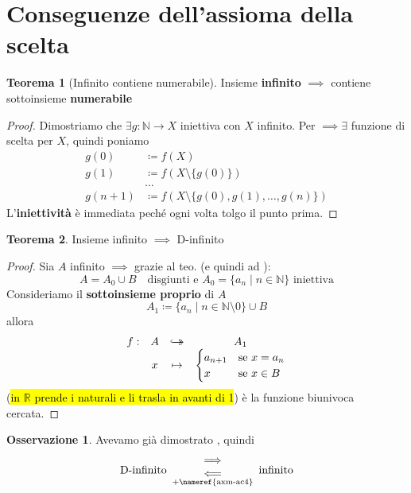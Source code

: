 \documentclass[a4paper,10pt]{article}
\theoremstyle{definition}
\newcommand{\na}{\mathbb{N}} %
\newcommand{\re}{\mathbb{R}} %
\newcommand{\hookdoubleheadrightarrow}{\hookrightarrow\mathrel{\mspace{-15mu}}\rightarrow}
\newcommand{\bij}{\hookdoubleheadrightarrow} %
\theoremstyle{indentdefinition}
\theoremstyle{indentpostulate}
\theoremstyle{indenttheorem}
\newtheorem{thm}{Teorema}[section]
\theoremstyle{myremark}
\newtheorem*{rem*}{Osservazione}
\theoremstyle{indentgeneral}
\newenvironment{myboxed} 
{\noindent\begin{lrbox}{\mybox}\begin{minipage}{\textwidth}}
{\end{minipage}\end{lrbox}\fbox{\usebox{\mybox}}}
\begin{document}
\pagebreak{}
\section{Conseguenze dell’assioma della scelta}
\begin{thm}[Infinito contiene numerabile]\label{thm-inf-contiene-numerabile}
    Insieme \textbf{infinito} $\implies$ contiene sottoinsieme \textbf{numerabile}
\end{thm}

\begin{proof}
    Dimostriamo che $\exists g:\na\to X$ iniettiva con $X$ infinito. Per $\implies\exists$ funzione di scelta per $X$, quindi poniamo
    \begin{align*}
        g(0)&\coloneqq f(X) \\
        g(1)&\coloneqq f(X\setminus\{g(0)\}) \\
        &\dots\\
         g(n+1)&\coloneqq f(X\setminus\{g(0),g(1),\dots,g(n)\})
    \end{align*}
    L'\textbf{iniettività} è immediata peché ogni volta tolgo il punto prima.
\end{proof}

\begin{myboxed}
    \begin{thm}
        Insieme infinito $\implies$ D-infinito
    \end{thm}
\end{myboxed}

\begin{proof} Sia $A$ infinito $\implies$ grazie al teo.  (e quindi ad ): 
$$A=A_0\cup  B\quad\text{disgiunti e }A_0=\{a_n\mid n\in\na\}\text{ iniettiva}$$
Consideriamo il \textbf{sottoinsieme proprio} di $A$
$$A_1\coloneqq  \{a_n\mid n\in\na\setminus 0\}\cup B$$
allora
$$\begin{array}{cccc}
   f:  & A & \bij & A_1  \\
       &  x & \mapsto & \begin{cases}
           a_{n+1} &\text{se }x=a_n\\
           x &\text{se }x\in B
       \end{cases}
\end{array}$$
  (\hl{in $\re$ prende i naturali e li trasla in avanti di 1}) è la funzione biunivoca cercata.
\end{proof}

\begin{rem*}
    Avevamo già dimostrato , quindi
     $$\text{D-infinito}\begin{array}{c}
         \implies  \\
         \underset{+\text{\nameref{axm-ac4}}}{\impliedby}
    \end{array}
        \text{infinito}$$
\end{rem*}
\end{document}
